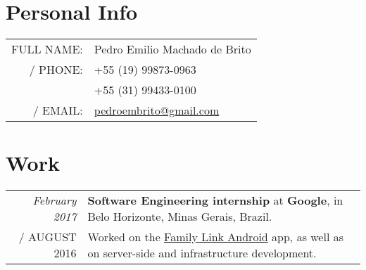 \documentclass[a4paper,10pt]{article}
\makeatletter
\def\fakesc#1{%
  \begingroup%
  \xdef\fake@name{\csname\curr@fontshape/\f@size\endcsname}%
  \fontsize{\fontdimen8\fake@name}{\baselineskip}\selectfont%
  \uppercase{#1}%
  \endgroup%
}
\renewcommand{\textsc}{\fakesc}
\makeatother
\begin{document}
\pagestyle{empty} %

\par{\bigskip\par}

\section{Personal Info}

\begin{tabularx}{\textwidth}{ rl}
  \textsc{Full name:} & Pedro Emilio Machado de Brito \\
  \textsc{Phone:}  & +55 (19) 99873-0963 \\
  & +55 (31) 99433-0100 \\
  \textsc{Email:} & \href{mailto:pedroembrito@gmail.com}{pedroembrito@gmail.com}\\
\end{tabularx}




\section{Work}

\begin{tabularx}{\textwidth}{r|X}	

  \emph{February 2017} & \textbf{Software Engineering internship} at \textbf{Google}, in Belo Horizonte, Minas Gerais, Brazil.\\
  \textsc{August 2016} & {\footnotesize Worked on the \href{https://play.google.com/store/apps/details?id=com.google.android.apps.kids.familylink}{Family Link Android} app, as well as on server-side and infrastructure development}.\\

\end{tabularx}
\end{document}
